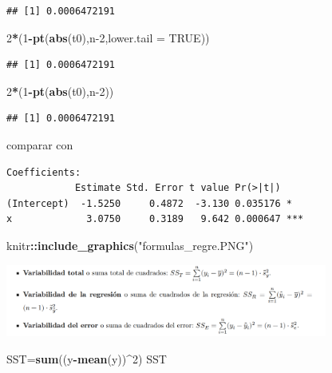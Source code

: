 \documentclass[
]{article}
\newenvironment{Shaded}{\begin{snugshade}}{\end{snugshade}}
\newcommand{\DataTypeTok}[1]{\textcolor[rgb]{0.13,0.29,0.53}{#1}}
\newcommand{\DecValTok}[1]{\textcolor[rgb]{0.00,0.00,0.81}{#1}}
\newcommand{\KeywordTok}[1]{\textcolor[rgb]{0.13,0.29,0.53}{\textbf{#1}}}
\newcommand{\NormalTok}[1]{#1}
\newcommand{\OperatorTok}[1]{\textcolor[rgb]{0.81,0.36,0.00}{\textbf{#1}}}
\newcommand{\OtherTok}[1]{\textcolor[rgb]{0.56,0.35,0.01}{#1}}
\newcommand{\StringTok}[1]{\textcolor[rgb]{0.31,0.60,0.02}{#1}}
\begin{document}
\begin{verbatim}
## [1] 0.0006472191
\end{verbatim}

\begin{Shaded}
\begin{Highlighting}[]
\DecValTok{2}\OperatorTok{*}\NormalTok{(}\DecValTok{1}\OperatorTok{-}\KeywordTok{pt}\NormalTok{(}\KeywordTok{abs}\NormalTok{(t0),n}\DecValTok{-2}\NormalTok{,}\DataTypeTok{lower.tail =} \OtherTok{TRUE}\NormalTok{))}
\end{Highlighting}
\end{Shaded}

\begin{verbatim}
## [1] 0.0006472191
\end{verbatim}

\begin{Shaded}
\begin{Highlighting}[]
\DecValTok{2}\OperatorTok{*}\NormalTok{(}\DecValTok{1}\OperatorTok{-}\KeywordTok{pt}\NormalTok{(}\KeywordTok{abs}\NormalTok{(t0),n}\DecValTok{-2}\NormalTok{))}
\end{Highlighting}
\end{Shaded}

\begin{verbatim}
## [1] 0.0006472191
\end{verbatim}

comparar con

\begin{verbatim}
Coefficients:
            Estimate Std. Error t value Pr(>|t|)    
(Intercept)  -1.5250     0.4872  -3.130 0.035176 *  
x             3.0750     0.3189   9.642 0.000647 ***
\end{verbatim}

\begin{Shaded}
\begin{Highlighting}[]
\NormalTok{knitr}\OperatorTok{::}\KeywordTok{include_graphics}\NormalTok{(}\StringTok{"formulas_regre.PNG"}\NormalTok{)}
\end{Highlighting}
\end{Shaded}

\includegraphics[width=400px]{formulas_regre}

\begin{Shaded}
\begin{Highlighting}[]
\NormalTok{SST=}\KeywordTok{sum}\NormalTok{((y}\OperatorTok{-}\KeywordTok{mean}\NormalTok{(y))}\OperatorTok{^}\DecValTok{2}\NormalTok{)}
\NormalTok{SST}
\end{Highlighting}
\end{Shaded}
\end{document}
